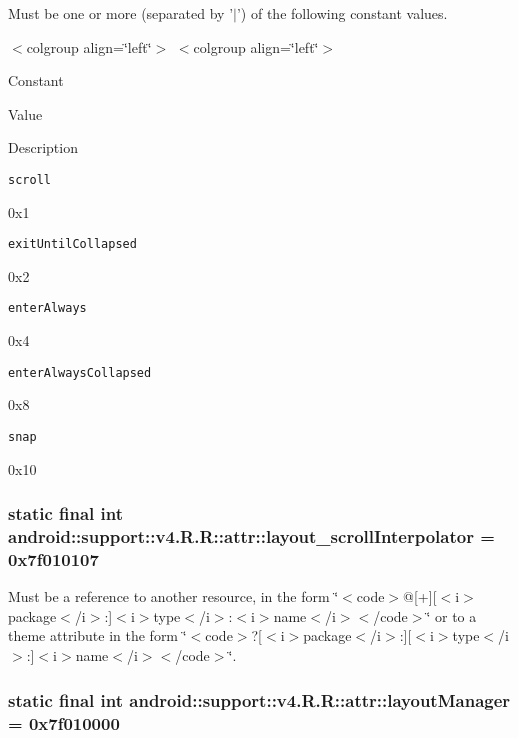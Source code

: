 Must be one or more (separated by '$|$') of the following constant values. \begin{TabularC}{0}
\hline
\end{TabularC}
$<$colgroup align=\char`\"{}left\char`\"{}$>$ $<$colgroup align=\char`\"{}left\char`\"{}$>$ 

Constant

Value

Description 

{\tt scroll}

0x1

{\tt exitUntilCollapsed}

0x2

{\tt enterAlways}

0x4

{\tt enterAlwaysCollapsed}

0x8

{\tt snap}

0x10\hypertarget{classandroid_1_1support_1_1v4_1_1_r_1_1attr_a4c2d8864dc05978cf783570c112b608}{
\subsubsection[{layout\_\-scrollInterpolator}]{\setlength{\rightskip}{0pt plus 5cm}static final int android::support::v4.R.R::attr::layout\_\-scrollInterpolator = 0x7f010107}}
\label{classandroid_1_1support_1_1v4_1_1_r_1_1attr_a4c2d8864dc05978cf783570c112b608}


Must be a reference to another resource, in the form \char`\"{}$<$code$>$@\mbox{[}+\mbox{]}\mbox{[}$<$i$>$package$<$/i$>$:\mbox{]}$<$i$>$type$<$/i$>$:$<$i$>$name$<$/i$>$$<$/code$>$\char`\"{} or to a theme attribute in the form \char`\"{}$<$code$>$?\mbox{[}$<$i$>$package$<$/i$>$:\mbox{]}\mbox{[}$<$i$>$type$<$/i$>$:\mbox{]}$<$i$>$name$<$/i$>$$<$/code$>$\char`\"{}. \hypertarget{classandroid_1_1support_1_1v4_1_1_r_1_1attr_86b921238d86f653417f6ecf6c9d30b3}{
\subsubsection[{layoutManager}]{\setlength{\rightskip}{0pt plus 5cm}static final int android::support::v4.R.R::attr::layoutManager = 0x7f010000}}
\label{classandroid_1_1support_1_1v4_1_1_r_1_1attr_86b921238d86f653417f6ecf6c9d30b3}


